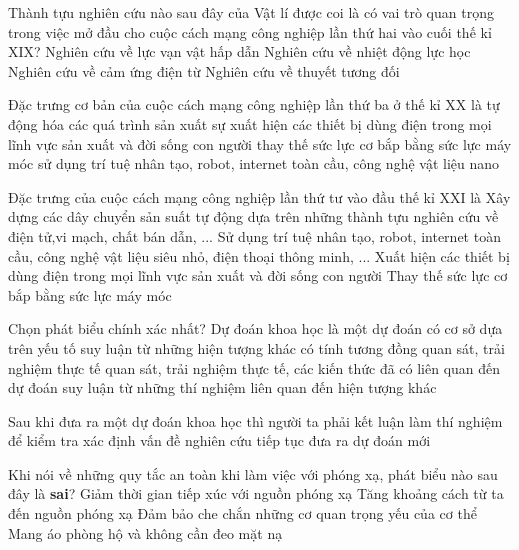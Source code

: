 \begin{ex}
	Thành tựu nghiên cứu nào sau đây của Vật lí được coi là có vai trò quan trọng trong việc mở đầu cho cuộc cách mạng công nghiệp lần thứ hai vào cuối thế kỉ XIX?
	\choice
	{Nghiên cứu về lực vạn vật hấp dẫn}
	{Nghiên cứu về nhiệt động lực học}
	{\True Nghiên cứu về cảm ứng điện từ}
	{Nghiên cứu về thuyết tương đối}
	\loigiai{}
\end{ex}

\begin{ex}
	Đặc trưng cơ bản của cuộc cách mạng công nghiệp lần thứ ba ở thế kỉ XX là
	\choice
	{\True tự động hóa các quá trình sản xuất}
	{sự xuất hiện các thiết bị dùng điện trong mọi lĩnh vực sản xuất và đời sống con người}
	{thay thế sức lực cơ bắp bằng sức lực máy móc}
	{sử dụng trí tuệ nhân tạo, robot, internet toàn cầu, công nghệ vật liệu nano}
	\loigiai{}
\end{ex}

\begin{ex}
	Đặc trưng của cuộc cách mạng công nghiệp lần thứ tư vào đầu thế kỉ XXI là
	\choice
	{Xây dựng các dây chuyển sản suất tự động dựa trên những thành tựu nghiên cứu về điện tử,vi mạch, chất bán dẫn, ...}
	{\True Sử dụng trí tuệ nhân tạo, robot, internet toàn cầu, công nghệ vật liệu siêu nhỏ, điện thoại thông minh, ...}
	{Xuất hiện các thiết bị dùng điện trong mọi lĩnh vực sản xuất và đời sống con người}
	{Thay thế sức lực cơ bắp bằng sức lực máy móc}
	\loigiai{}
\end{ex}

\begin{ex}
	Chọn phát biểu chính xác nhất? Dự đoán khoa học là một dự đoán có cơ sở dựa trên yếu tố
	\choice
	{suy luận từ những hiện tượng khác có tính tương đồng}
	{quan sát, trải nghiệm thực tế}
	{\True quan sát, trải nghiệm thực tế, các kiến thức đã có liên quan đến dự đoán}
	{suy luận từ những thí nghiệm liên quan đến hiện tượng khác}
	\loigiai{}
\end{ex}

\begin{ex}
	Sau khi đưa ra một dự đoán khoa học thì người ta phải
	\choice
	{kết luận}
	{\True làm thí nghiệm để kiểm tra}
	{xác định vấn đề nghiên cứu}
	{tiếp tục đưa ra dự đoán mới}
	\loigiai{}
\end{ex}

\begin{ex}
	Khi nói về những quy tắc an toàn khi làm việc với phóng xạ, phát biểu nào sau đây là \textbf{sai}?
	\choice
	{Giảm thời gian tiếp xúc với nguồn phóng xạ}
	{Tăng khoảng cách từ ta đến nguồn phóng xạ}
	{Đảm bảo che chắn những cơ quan trọng yếu của cơ thể}
	{\True Mang áo phòng hộ và không cần đeo mặt nạ}
	\loigiai{}
\end{ex}

